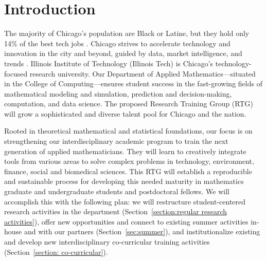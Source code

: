 \documentclass[11pt]{NSFamsart}
\begin{document}
\section{Introduction}

The majority of Chicago's population are Black or Latine, 
but they hold only 14\% of the best tech jobs \cite{P33}. 
Chicago strives to accelerate  technology and innovation in the city and beyond, guided by data, market intelligence, and trends \cite{Chicago}. Illinois Institute of Technology (Illinois Tech) is Chicago's technology-focused research university.  Our Department of Applied Mathematics---situated in the College of Computing---ensures student success in the fast-growing fields of mathematical modeling and simulation, prediction and decision-making, computation, and data science. 
The proposed Research Training Group (RTG) will grow a sophisticated and diverse talent pool for Chicago and the nation. 

Rooted in theoretical mathematical and statistical foundations, our focus is on strengthening our interdisciplinary academic program to train the next generation of applied mathematicians.  They will learn to creatively integrate tools from various areas to solve complex problems in technology, environment, finance, social and biomedical sciences. This RTG will establish  a reproducible and sustainable process for developing this needed maturity in mathematics graduate and undergraduate students and postdoctoral fellows. We will accomplish this with the following plan:  we will restructure student-centered research activities in the department (Section~\ref{section:regular research activities}), offer new opportunities and connect to existing summer activities in-house and with our partners (Section~\ref{sec:summer}), and institutionalize existing and develop new interdisciplinary co-curricular training activities (Section~\ref{section: co-curricular}). 
\end{document}
